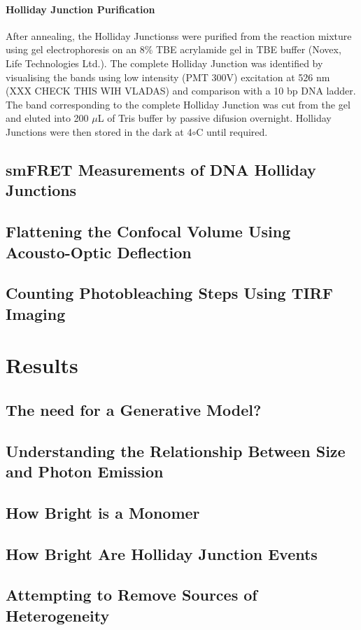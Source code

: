 \paragraph{Holliday Junction Purification}
After annealing, the Holliday Junctionss were purified from the reaction mixture using gel electrophoresis on an 8\% TBE acrylamide gel in TBE buffer (Novex, Life Technologies Ltd.). The complete Holliday Junction was identified by visualising the bands using low intensity (PMT 300V) excitation at 526 nm (XXX CHECK THIS WIH VLADAS) and comparison with a 10 bp DNA ladder. The band corresponding to the complete Holliday Junction was cut from the gel and eluted into 200 $\mu$L of Tris buffer by passive difusion overnight. Holliday Junctions were then stored in the dark at 4$\circ$C until required.

\subsection{smFRET Measurements of DNA Holliday Junctions}
\subsection{Flattening the Confocal Volume Using Acousto-Optic Deflection}
\subsection{Counting Photobleaching Steps Using TIRF Imaging}

\section{Results}
\subsection{The need for a Generative Model?}
\subsection{Understanding the Relationship Between Size and Photon Emission}
\subsection{How Bright is a Monomer}
\subsection{How Bright Are Holliday Junction Events}
\subsection{Attempting to Remove Sources of Heterogeneity}
